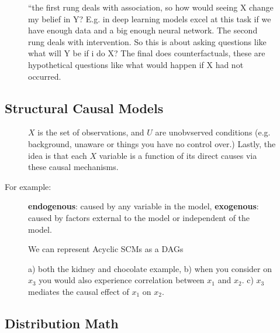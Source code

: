 \documentclass[11pt]{article}
\begin{document}
\begin{figure}[H]
    \centering
    \caption{``the first rung deals with association, so how would seeing X change my belief in Y? E.g. in deep learning models excel at this task if we have enough data and a big enough neural network. The second rung deals with intervention. So this is about asking questions like what will Y be if i do X? The final does counterfactuals, these are hypothetical questions like what would happen if X had not occurred.}
\end{figure}

\subsection{Structural Causal Models}

\begin{figure}[H]
    \centering
    \caption{$X$ is the set of observations, and $U$ are unobvserved conditions (e.g. background, unaware or things you have no control over.) Lastly, the idea is that each $X$ variable is a function of its direct causes via these causal mechanisms.}
\end{figure}

For example:

\begin{figure}[H]
    \centering
    \caption{\textbf{endogenous}: caused by any variable in the model, \textbf{exogenous}: caused by factors external to the model or independent of the model.}
\end{figure}

\begin{figure}[H]
    \centering
    \caption{We can represent Acyclic SCMs as a DAGs}
\end{figure}

\begin{figure}[H]
    \centering
    \caption{a) both the kidney and chocolate example, b) when you consider on $x_3$ you would also experience correlation between $x_1$ and $x_2$. c) $x_3$ mediates the causal effect of $x_1$ on $x_2$.}
\end{figure}

\subsection{Distribution Math}
\end{document}
